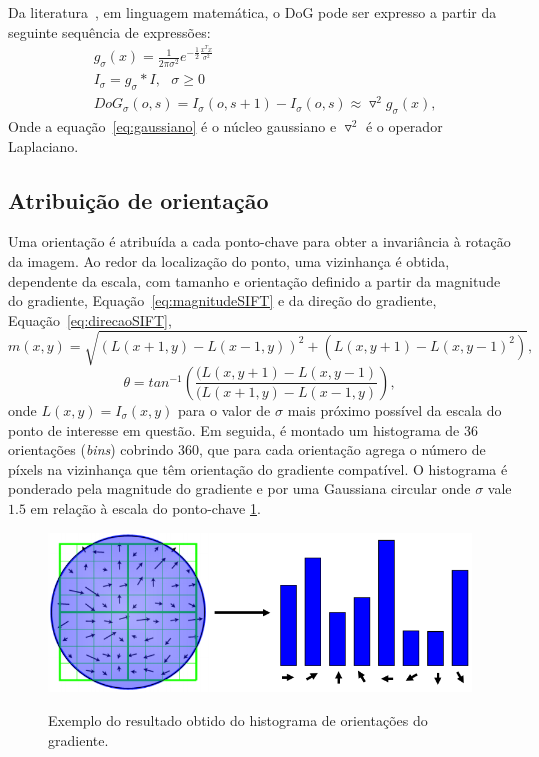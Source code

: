Da literatura~\cite{culjak2012brief}, em linguagem matemática, o DoG pode ser expresso a partir da seguinte sequência
de expressões: 
\begin{align}
\label{eq:gaussiano}
	&g_\sigma(x) = \frac{1}{2 \pi \sigma ^2} e^{-\frac{1}{2} \frac{x^T x}{\sigma
  ^2}}\\
\label{eq:gaussianScaleSpace}
	&I_\sigma = g_\sigma * I,\ \ \ \sigma \geq 0\\
\label{eq:DoG}
	&DoG_\sigma(o,s) = I_\sigma(o,s+1) - I_\sigma(o,s) \approx \triangledown^2
  g_\sigma(x),
\end{align}
Onde a equação~\ref{eq:gaussiano} é o núcleo gaussiano e $\triangledown^2$ é o operador Laplaciano.

\subsection{Atribuição de orientação}

Uma orientação é atribuída a cada ponto-chave para obter a invariância à rotação da imagem. 
Ao redor da localização do ponto, uma vizinhança é obtida, dependente da escala,
com tamanho e orientação definido a partir da magnitude do gradiente,
Equação~\ref{eq:magnitudeSIFT} e da direção do gradiente,
Equação~\ref{eq:direcaoSIFT}, 
\begin{equation}
	m(x,y) = \sqrt{(L(x+1,y)-L(x-1,y))^2 + (L(x,y+1)-L(x,y-1)^2)},
	\label{eq:magnitudeSIFT}
\end{equation}
\begin{equation}
	\theta = tan^{-1} \left(
  \frac{(L(x,y+1)-L(x,y-1)}{(L(x+1,y)-L(x-1,y)}\right),
	\label{eq:direcaoSIFT}
\end{equation}
onde $L(x,y) = I_\sigma(x,y)$ para o valor de $\sigma$ mais próximo possível da
escala do ponto de interesse em questão.  Em seguida, é montado um histograma de 36
orientações (\emph{bins}) cobrindo 360, que para cada orientação agrega o número
de píxels na vizinhança que têm orientação do gradiente compatível. O histograma é ponderado
pela magnitude do gradiente e por uma Gaussiana circular onde $\sigma$ vale
$1.5$ em relação à escala do ponto-chave \ref{fig:histogramaOrientado}.

\begin{figure} [!h]
	\centering
	\caption{%
	Exemplo do resultado obtido do histograma de orientações do gradiente.
	}
	\includegraphics[width=0.45\linewidth]{figs/histogramaOrientado.png}
	\label{fig:histogramaOrientado}
\end{figure}


